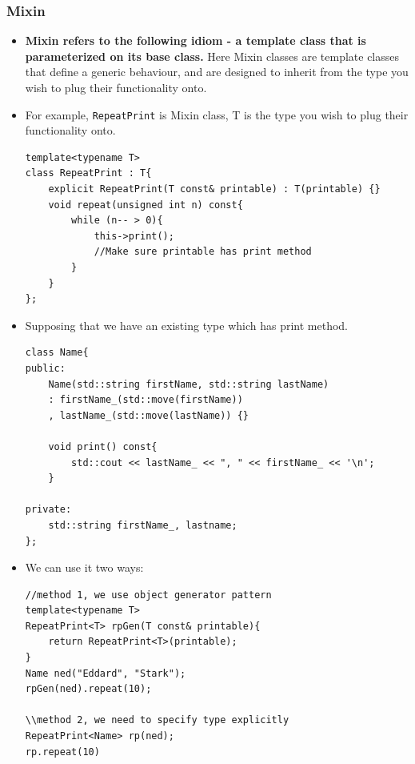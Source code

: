 \documentclass[a4paper,11pt,twoside]{book}
\begin{document}
\subsubsection{Mixin}
\begin{itemize}
	\item \textbf{Mixin refers to the following idiom - a template class that is parameterized on its base class.} Here Mixin classes are template classes that define a generic behaviour, and are designed to inherit from the type you wish to plug their functionality onto.
	
	\item For example, \texttt{RepeatPrint} is Mixin class, T is the type you wish to plug their functionality onto.
\begin{lstlisting}[numbers=none]
template<typename T>
class RepeatPrint : T{
	explicit RepeatPrint(T const& printable) : T(printable) {}
	void repeat(unsigned int n) const{
		while (n-- > 0){
			this->print(); 
			//Make sure printable has print method
		}
	}
};
\end{lstlisting}
	
	\item Supposing that we have an existing type which has print method.
\begin{lstlisting}[numbers=none]
class Name{
public:
	Name(std::string firstName, std::string lastName)
	: firstName_(std::move(firstName))
	, lastName_(std::move(lastName)) {}
	
	void print() const{
		std::cout << lastName_ << ", " << firstName_ << '\n';
	}
	
private:
	std::string firstName_, lastname;
};
\end{lstlisting}
	
	\item We can use it two ways:
\begin{lstlisting}[numbers=none]
//method 1, we use object generator pattern
template<typename T>
RepeatPrint<T> rpGen(T const& printable){
	return RepeatPrint<T>(printable);
}
Name ned("Eddard", "Stark");    
rpGen(ned).repeat(10);

\\method 2, we need to specify type explicitly
RepeatPrint<Name> rp(ned);
rp.repeat(10)
\end{lstlisting}

\end{itemize}
\end{document}
